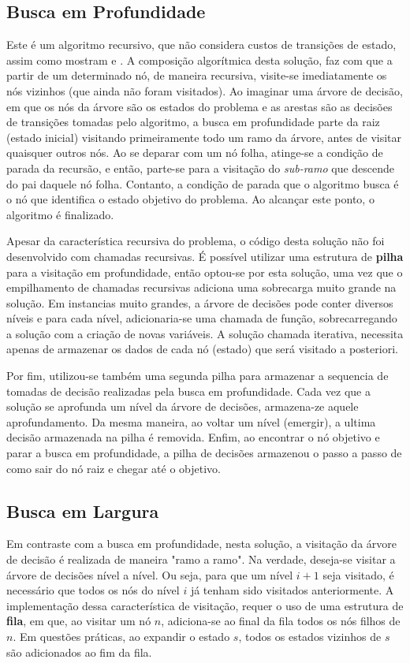 \documentclass[12pt]{article}
\begin{document}
\subsection{Busca em Profundidade}
Este é um algoritmo recursivo, que não considera custos de transições de
estado, assim como mostram \cite{cormem} e \cite{livro-texto}.
A composição algorítmica desta solução, faz com que a partir de um determinado
nó, de maneira recursiva, visite-se imediatamente os nós vizinhos (que ainda
não foram visitados).
Ao imaginar uma árvore de decisão, em que os nós da árvore são os estados do
problema e as arestas são as decisões de transições tomadas pelo algoritmo,
a busca em profundidade parte da raiz (estado inicial) visitando primeiramente
todo um ramo da árvore, antes de visitar quaisquer outros nós.
Ao se deparar com um nó folha, atinge-se a condição de parada da recursão,
e então, parte-se para a visitação do \textit{sub-ramo} que descende do pai
daquele nó folha.
Contanto, a condição de parada que o algoritmo busca é o nó que identifica
o estado objetivo do problema.
Ao alcançar este ponto, o algoritmo é finalizado.

Apesar da característica recursiva do problema, o código desta solução não
foi desenvolvido com chamadas recursivas.
É possível utilizar uma estrutura de \textbf{pilha} para a visitação em
profundidade, então optou-se por esta solução, uma vez que o empilhamento
de chamadas recursivas adiciona uma sobrecarga muito grande na solução.
Em instancias muito grandes, a árvore de decisões pode conter diversos níveis
e para cada nível, adicionaria-se uma chamada de função, sobrecarregando
a solução com a criação de novas variáveis.
A solução chamada iterativa, necessita apenas de armazenar os dados de cada
nó (estado) que será visitado a posteriori.

Por fim, utilizou-se também uma segunda pilha para armazenar a sequencia de
tomadas de decisão realizadas pela busca em profundidade.
Cada vez que a solução se aprofunda um nível da árvore de decisões, armazena-ze
aquele aprofundamento.
Da mesma maneira, ao voltar um nível (emergir), a ultima decisão armazenada
na pilha é removida.
Enfim, ao encontrar o nó objetivo e parar a busca em profundidade, a pilha
de decisões armazenou o passo a passo de como sair do nó raiz e chegar até
o objetivo.

\subsection{Busca em Largura}
Em contraste com a busca em profundidade, nesta solução, a visitação
da árvore de decisão é realizada de maneira "ramo a ramo".
Na verdade, deseja-se visitar a árvore de decisões nível a nível.
Ou seja, para que um nível $i+1$ seja visitado, é necessário que todos
os nós do nível $i$ já tenham sido visitados anteriormente.
A implementação dessa característica de visitação, requer o uso de uma
estrutura de \textbf{fila}, em que, ao visitar um nó $n$, adiciona-se
ao final da fila todos os nós filhos de $n$.
Em questões práticas, ao expandir o estado $s$, todos os estados vizinhos
de $s$ são adicionados ao fim da fila.
\end{document}
